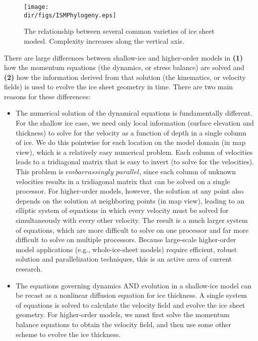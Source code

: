 \begin{figure}
  \begin{center}
    \texttt{[image: \\dir/figs/ISMPhylogeny.eps]}
   \end{center}
  \caption{The relationship between several common varieties of ice sheet modesl. Complexity increases along the vertical axis.}
   \label{fig:phylogeny}
\end{figure} 

There are large differences between shallow-ice and higher-order models in 
\textbf{(1)} how the momentum equations (the dynamics, or stress balance) are solved and 
\textbf{(2)} how the information derived from that solution (the kinematics, or velocity fields) is used to evolve the ice sheet geometry in time. There are two main reasons for these differences:

\begin{itemize}
\item  The numerical solution of the dynamical equations is fundamentally different. For the shallow ice case, we need only local information (surface elevation and thickness) to solve for the velocity as a function of depth in a single column of ice. We do this pointwise for each location on the model domain (in map view), which is a relatively easy numerical problem.  Each column of velocities leads to a tridiagonal matrix that is easy to invert (to solve for the velocities). This problem is $embarrassingly$ $parallel$, since each column of unknown velocities results in a tridiagonal matrix that can be solved on a single processor. For higher-order models, however, the solution at any point also depends on the solution at neighboring points (in map view),
leading to an elliptic system of equations in which every velocity must be solved for simultaneously with every other velocity. The result is a much larger system of equations, which are more difficult to solve on one processor and far more difficult to solve on multiple processors. Because large-scale higher-order model applications (e.g., whole-ice-sheet models) require efficient, robust solution and parallelization techniques, this is an active area of current research.  
\end{itemize}

\begin{itemize}
\item  The equations governing dynamics AND evolution in a shallow-ice model can be recast as a nonlinear diffusion equation for ice thickness. A single system of equations is solved to calculate the velocity field and evolve the ice sheet geometry. For higher-order models, we must first solve the momentum balance equations to obtain the velocity field, and then use some other scheme to evolve the ice thickness. 
\end{itemize}

